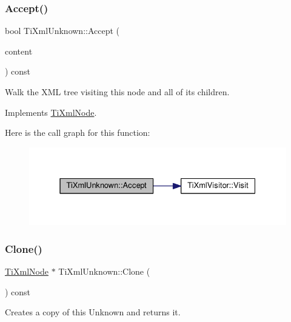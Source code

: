 \subsubsection{\texorpdfstring{Accept()}{Accept()}}
{\footnotesize\ttfamily bool Ti\+Xml\+Unknown\+::\+Accept (\begin{DoxyParamCaption}\item[{\hyperlink{class_ti_xml_visitor}{Ti\+Xml\+Visitor} $\ast$}]{content }\end{DoxyParamCaption}) const\hspace{0.3cm}{\ttfamily [virtual]}}

Walk the X\+ML tree visiting this node and all of its children. 

Implements \hyperlink{class_ti_xml_node_acc0f88b7462c6cb73809d410a4f5bb86}{Ti\+Xml\+Node}.

Here is the call graph for this function\+:
\nopagebreak
\begin{figure}[H]
\begin{center}
\leavevmode
\includegraphics[width=331pt]{class_ti_xml_unknown_aafdf1b2d4f561979c7907bad91004999_cgraph}
\end{center}
\end{figure}
\mbox{\label{class_ti_xml_unknown_a3dea7689de5b1931fd6657992948fde0}} 
\subsubsection{\texorpdfstring{Clone()}{Clone()}}
{\footnotesize\ttfamily \hyperlink{class_ti_xml_node}{Ti\+Xml\+Node} $\ast$ Ti\+Xml\+Unknown\+::\+Clone (\begin{DoxyParamCaption}{ }\end{DoxyParamCaption}) const\hspace{0.3cm}{\ttfamily [virtual]}}



Creates a copy of this Unknown and returns it. 



